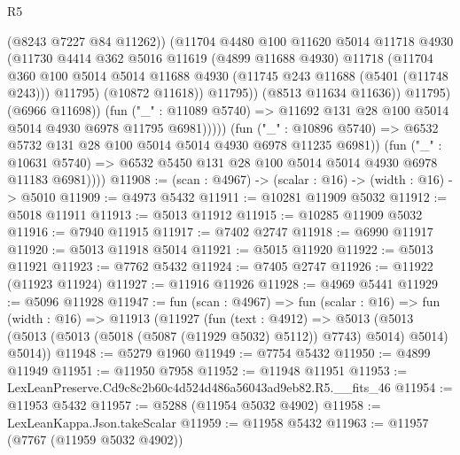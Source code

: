 \begin{lexlean}{R5}
\begin{coremodule}
                              (@8243 @7227 @84 @11262))
                            (@11704
                              @4480
                              @100
                              @11620
                              @5014
                              @11718
                              @4930
                              (@11730
                                @4414
                                @362
                                @5016
                                @11619
                                (@4899 @11688 @4930)
                                @11718
                                (@11704
                                  @360
                                  @100
                                  @5014
                                  @5014
                                  @11688
                                  @4930
                                  (@11745 @243 @11688 (@5401 (@11748 @243)))
                                  @11795)
                                (@10872 @11618))
                              @11795))
                          (@8513 @11634 @11636))
                        @11795)
                      (@6966 @11698))
                    (fun ("_" : @11089 @5740) =>
                    @11692 @131 @28 @100 @5014 @5014 @4930 @6978 @11795 @6981)))))
            (fun ("_" : @10896 @5740) =>
            @6532 @5732 @131 @28 @100 @5014 @5014 @4930 @6978 @11235 @6981))
          (fun ("_" : @10631 @5740) =>
          @6532 @5450 @131 @28 @100 @5014 @5014 @4930 @6978 @11183 @6981))))
@11908 := (scan : @4967) -> (scalar : @16) -> (width : @16) -> @5010
@11909 := @4973 @5432
@11911 := @10281 @11909 @5032
@11912 := @5018 @11911
@11913 := @5013 @11912
@11915 := @10285 @11909 @5032
@11916 := @7940 @11915
@11917 := @7402 @2747
@11918 := @6990 @11917
@11920 := @5013 @11918 @5014
@11921 := @5015 @11920
@11922 := @5013 @11921
@11923 := @7762 @5432
@11924 := @7405 @2747
@11926 := @11922 (@11923 @11924)
@11927 := @11916 @11926
@11928 := @4969 @5441
@11929 := @5096 @11928
@11947 := fun (scan : @4967) =>
  fun (scalar : @16) =>
  fun (width : @16) =>
  @11913
    (@11927
      (fun (text : @4912) =>
      @5013 (@5013 (@5013 (@5013 (@5018 (@5087 (@11929 @5032) @5112)) @7743) @5014) @5014) @5014))
@11948 := @5279 @1960
@11949 := @7754 @5432
@11950 := @4899 @11949
@11951 := @11950 @7958
@11952 := @11948 @11951
@11953 := LexLeanPreserve.Cd9c8c2b60c4d524d486a56043ad9eb82.R5.__fits_46
@11954 := @11953 @5432
@11957 := @5288 (@11954 @5032 @4902)
@11958 := LexLeanKappa.Json.takeScalar
@11959 := @11958 @5432
@11963 := @11957 (@7767 (@11959 @5032 @4902))

\end{coremodule}
\end{lexlean}
